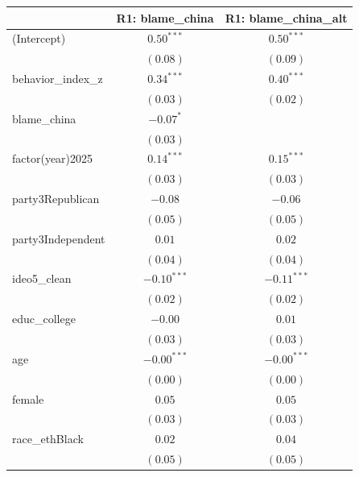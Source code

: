 
\begin{tabular}{l c c}
\toprule
 & R1: blame\_china & R1: blame\_china\_alt \\
\midrule
(Intercept)                          & $0.50^{***}$  & $0.50^{***}$  \\
                                     & $(0.08)$      & $(0.09)$      \\
behavior\_index\_z                   & $0.34^{***}$  & $0.40^{***}$  \\
                                     & $(0.03)$      & $(0.02)$      \\
blame\_china                         & $-0.07^{*}$   &               \\
                                     & $(0.03)$      &               \\
factor(year)2025                     & $0.14^{***}$  & $0.15^{***}$  \\
                                     & $(0.03)$      & $(0.03)$      \\
party3Republican                     & $-0.08$       & $-0.06$       \\
                                     & $(0.05)$      & $(0.05)$      \\
party3Independent                    & $0.01$        & $0.02$        \\
                                     & $(0.04)$      & $(0.04)$      \\
ideo5\_clean                         & $-0.10^{***}$ & $-0.11^{***}$ \\
                                     & $(0.02)$      & $(0.02)$      \\
educ\_college                        & $-0.00$       & $0.01$        \\
                                     & $(0.03)$      & $(0.03)$      \\
age                                  & $-0.00^{***}$ & $-0.00^{***}$ \\
                                     & $(0.00)$      & $(0.00)$      \\
female                               & $0.05$        & $0.05$        \\
                                     & $(0.03)$      & $(0.03)$      \\
race\_ethBlack                       & $0.02$        & $0.04$        \\
                                     & $(0.05)$      & $(0.05)$      \\

\end{tabular}
